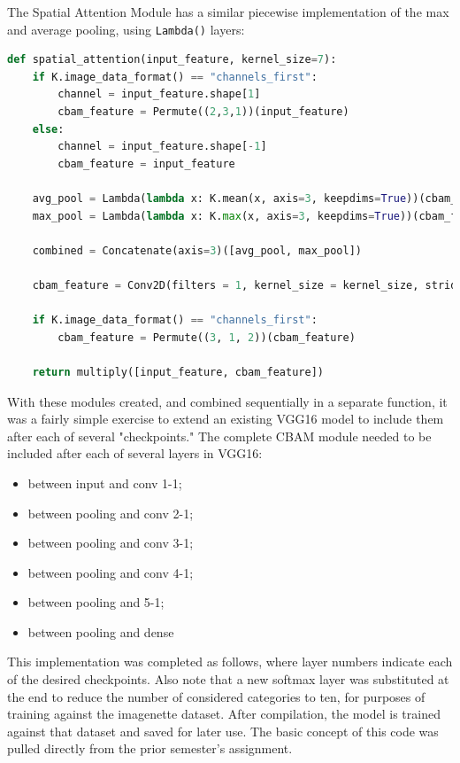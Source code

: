 \documentclass{article}
\begin{document}
The Spatial Attention Module has a similar piecewise implementation of the max and average pooling, using \lstinline{Lambda()} layers:

\begin{lstlisting}[language=Python]
def spatial_attention(input_feature, kernel_size=7):
    if K.image_data_format() == "channels_first":
        channel = input_feature.shape[1]
        cbam_feature = Permute((2,3,1))(input_feature)
    else:
        channel = input_feature.shape[-1]
        cbam_feature = input_feature

    avg_pool = Lambda(lambda x: K.mean(x, axis=3, keepdims=True))(cbam_feature)
    max_pool = Lambda(lambda x: K.max(x, axis=3, keepdims=True))(cbam_feature)

    combined = Concatenate(axis=3)([avg_pool, max_pool])

    cbam_feature = Conv2D(filters = 1, kernel_size = kernel_size, strides=1, padding='same', activation='sigmoid', kernel_initializer='he_normal', use_bias=False)(combined)

    if K.image_data_format() == "channels_first":
        cbam_feature = Permute((3, 1, 2))(cbam_feature)

    return multiply([input_feature, cbam_feature])
\end{lstlisting}

With these modules created, and combined sequentially in a separate function, it was a fairly simple exercise to extend an existing VGG16 model to include them after each of several "checkpoints."
The complete CBAM module needed to be included after each of several layers in VGG16:
\begin{itemize}
    \item between input and conv 1-1;
    \item between pooling and conv 2-1; 
    \item between pooling and conv 3-1;  
    \item between pooling and conv 4-1;  
    \item between pooling and 5-1; 
    \item between pooling and dense
\end{itemize}

This implementation was completed as follows, where layer numbers indicate each of the desired checkpoints.
Also note that a new softmax layer was substituted at the end to reduce the number of considered categories to ten, for purposes of training against the imagenette dataset.
After compilation, the model is trained against that dataset and saved for later use.
The basic concept of this code was pulled directly from the prior semester's assignment.
\end{document}
